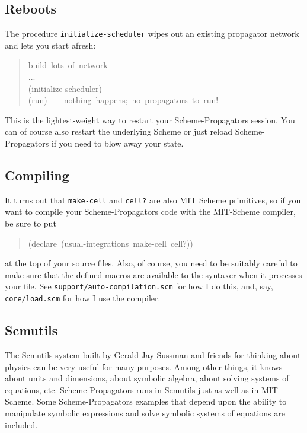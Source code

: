 \documentclass[12pt,letterpaper,english]{article}
\begin{document}

\subsection{Reboots}
\label{reboots}

The procedure \texttt{initialize-scheduler} wipes out an existing
propagator network and lets you start afresh:
\begin{quote}{\ttfamily \raggedright \noindent
build~lots~of~network~\\
...~\\
(initialize-scheduler)~\\
(run)~-{}-{}-~nothing~happens;~no~propagators~to~run!
}\end{quote}

This is the lightest-weight way to restart your Scheme-Propagators
session.  You can of course also restart the underlying Scheme or just
reload Scheme-Propagators if you need to blow away your state.



\subsection{Compiling}
\label{compiling}

It turns out that \texttt{make-cell} and \texttt{cell?} are also MIT Scheme
primitives, so if you want to compile your Scheme-Propagators
code with the MIT-Scheme compiler, be sure to put
\begin{quote}{\ttfamily \raggedright \noindent
(declare~(usual-integrations~make-cell~cell?))
}\end{quote}
at the top of your source files.  Also, of course, you need to be
suitably careful to make sure that the defined macros are available to
the syntaxer when it processes your file.  See
\texttt{support/auto-compilation.scm} for how I do this, and, say,
\texttt{core/load.scm} for how I use the compiler.



\subsection{Scmutils}
\label{scmutils}

The \href{http://groups.csail.mit.edu/mac/users/gjs/6946/linux-install.htm}{Scmutils} system built by Gerald Jay Sussman and friends for
thinking about physics can be very useful for many purposes.  Among
other things, it knows about units and dimensions, about symbolic
algebra, about solving systems of equations, etc.  Scheme-Propagators
runs in Scmutils just as well as in MIT Scheme.  Some
Scheme-Propagators examples that depend upon the ability to manipulate
symbolic expressions and solve symbolic systems of equations are
included.
\end{document}

